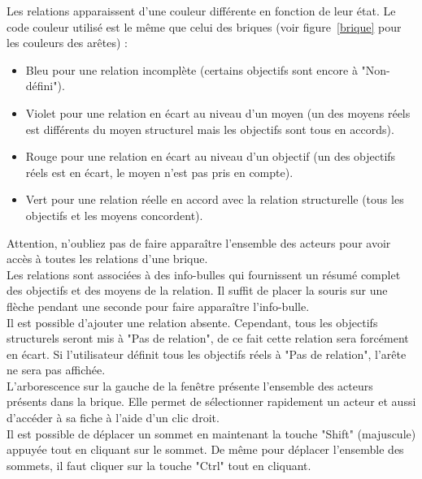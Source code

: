 Les relations apparaissent d'une couleur différente en fonction de leur état. Le code couleur utilisé est le même que celui des briques (voir figure~\ref{brique} pour les couleurs des arêtes) :
\begin{itemize}
\item Bleu pour une relation incomplète (certains objectifs sont encore à "Non-défini").
\item Violet pour une relation en écart au niveau d'un moyen (un des moyens réels est différents du moyen structurel mais les objectifs sont tous en accords).
\item Rouge pour une relation en écart au niveau d'un objectif (un des objectifs réels est en écart, le moyen n'est pas pris en compte).
\item Vert pour une relation réelle en accord avec la relation structurelle (tous les objectifs et les moyens concordent).
\end{itemize}

Attention, n'oubliez pas de faire apparaître l'ensemble des acteurs pour avoir accès à toutes les relations d'une brique.\\

Les relations sont associées à des info-bulles qui fournissent un résumé complet des objectifs et des moyens de la relation. Il suffit de placer la souris sur une flèche pendant une seconde pour faire apparaître l'info-bulle.\\

Il est possible d'ajouter une relation absente. Cependant, tous les objectifs structurels seront mis à "Pas de relation", de ce fait cette relation sera forcément en écart. Si l'utilisateur définit tous les objectifs réels à "Pas de relation", l'arête ne sera pas affichée.\\

L'arborescence sur la gauche de la fenêtre présente l'ensemble des acteurs présents dans la brique. Elle permet de sélectionner rapidement un acteur et aussi d'accéder à sa fiche à l'aide d'un clic droit.\\

Il est possible de déplacer un sommet en maintenant la touche "Shift" (majuscule) appuyée tout en cliquant sur le sommet. De même pour déplacer l'ensemble des sommets, il faut cliquer sur la touche "Ctrl" tout en cliquant.\\ 

